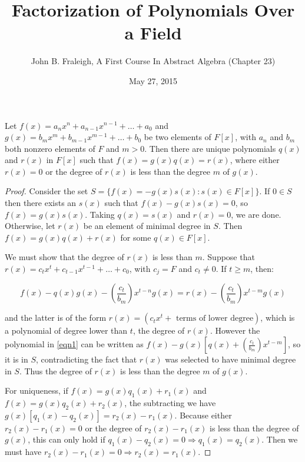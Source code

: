 \documentclass[a4paper,11pt]{article}
\title{Factorization of Polynomials Over a Field}
\author{John B. Fraleigh, A First Course In Abstract Algebra (Chapter 23)}
\date{May 27, 2015}
\begin{document}
\maketitle
{}

\begin{outline}

    Let \(f(x) = a_nx^n + a_{n-1}x^{n-1} + \ldots + a_0\)
    and \(g(x) = b_mx^m + b_{m-1}x^{m-1} + \ldots + b_0\) be two elements of \(F[x]\), with \(a_n\) and \(b_m\)
    both nonzero elements of \(F\) and \(m > 0\). Then there are unique polynomials \(q(x)\) and \(r(x)\) in \(F[x]\)
    such that \(f(x) = g(x)q(x) = r(x)\), where either \(r(x) = 0\) or the degree of \(r(x)\) is less than the degree
    \(m\) of \(g(x)\).
    
    \begin{proof}
      Consider the set \(S = \{f(x) =- g(x)s(x) : s(x) \in F[x]\}\). If \(0 \in S\) then there exists an \(s(x)\)
      such that \(f(x) - g(x)s(x) = 0\), so \(f(x) = g(x)s(x)\). Taking \(q(x) = s(x)\) and \(r(x) = 0\), we are done.
      Otherwise, let \(r(x)\) be an element of minimal degree in \(S\). Then \(f(x) = g(x)q(x) + r(x)\) for some \(q(x)
      \in F[x]\). 
      
      We must show that the degree of \(r(x)\) is less than \(m\). Suppose that \(r(x) = c_tx^t + c_{t-1}x^{t-1}
      + \ldots + c_0\), with \(c_j = F\) and \(c_t \neq 0\). If \(t \geq m\), then:
      
      \begin{equation}
      \label{eqn1}
      f(x) - q(x)g(x) - (\frac{c_t}{b_m})x^{t-n}g(x) = r(x) - (\frac{c_t}{b_m})x^{t-m}g(x)
      \end{equation}
      
      and the latter is of the form \(r(x) = (c_tx^t + \text{ terms of lower degree})\), which is a polynomial of degree
      lower than \(t\), the degree of \(r(x)\). However the polynomial in \eqref{eqn1} can be written as 
      \(f(x) - g(x)[q(x) + (\frac{c_t}{b_m})x^{t-m}]\), so it is in \(S\), contradicting the fact that 
      \(r(x)\) was selected to have minimal degree in \(S\). Thus the degree of \(r(x)\) is less than the degree \(m\) of
      \(g(x)\).
      
      For uniqueness, if \(f(x) = g(x)q_1(x) + r_1(x)\) and \(f(x) = g(x)q_2(x) + r_2(x)\), the subtracting we have
      \(g(x)[q_1(x)-q_2(x)] = r_2(x) - r_1(x)\). Because either \(r_2(x) - r_1(x) = 0\) or the degree of \(r_2(x) - r_1(x)\)
      is less than the degree of \(g(x)\), this can only hold if \(q_1(x) - q_2(x) = 0 \Rightarrow q_1(x) = q_2(x)\). Then
      we must have \(r_2(x) - r_1(x) = 0 \Rightarrow r_2(x) = r_1(x)\).
    \end{proof}


\end{outline}
\end{document}
